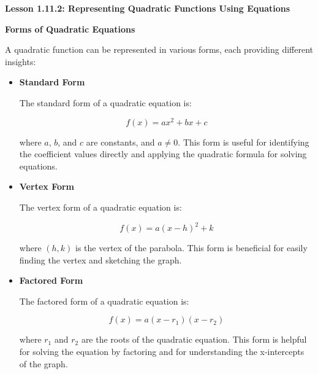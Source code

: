 \begin{center}
\textbf{Lesson 1.11.2: Representing Quadratic Functions Using Equations}
\end{center}

\textbf{Forms of Quadratic Equations}

A quadratic function can be represented in various forms, each providing different insights:
\begin{itemize}
\item \textbf{Standard Form}

The standard form of a quadratic equation is:

\vspace*{-1.7ex}
\[ f(x) = ax^2 + bx + c \]
\vspace*{-3ex}

where \(a\), \(b\), and \(c\) are constants, and \(a \neq 0\). This form is useful for identifying the coefficient values directly and applying the quadratic formula for solving equations.
\item \textbf{Vertex Form}

The vertex form of a quadratic equation is:

\vspace*{-1.7ex}
\[ f(x) = a(x-h)^2 + k \]
\vspace*{-3ex}

where \((h, k)\) is the vertex of the parabola. This form is beneficial for easily finding the vertex and sketching the graph.
\item \textbf{Factored Form}

The factored form of a quadratic equation is:

\vspace*{-1.7ex}
\[ f(x) = a(x - r_1)(x - r_2) \]
\vspace*{-3ex}

where \(r_1\) and \(r_2\) are the roots of the quadratic equation. This form is helpful for solving the equation by factoring and for understanding the x-intercepts of the graph.
\end{itemize}








